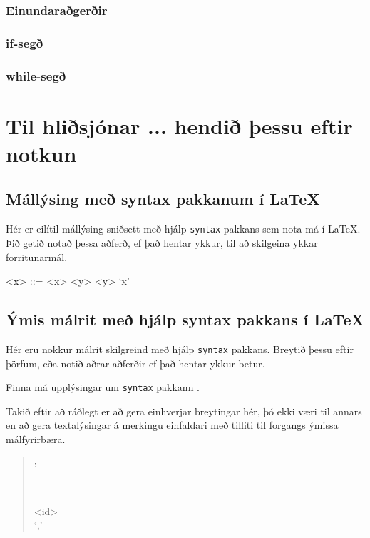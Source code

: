 \documentclass[12pt,a4paper]{article}
\newenvironment{málrit}[1]{%
	\par\noindent\begin{minipage}{\linewidth}\vspace{0.5em}\begin{quote}\noindent%
	\hspace*{-2em}\synt{#1}:\hfill\par%
	\noindent%
	\begin{minipage}{\linewidth}\begin{syntdiag}%
}{%
	\end{syntdiag}\end{minipage}\end{quote}\end{minipage}%
}
\begin{document}
\subsubsection{Einundaraðgerðir}
\subsubsection{if-segð}
\subsubsection{while-segð}
\section{Til hliðsjónar ... hendið þessu eftir notkun}

\subsection{Mállýsing með syntax pakkanum í LaTeX}

Hér er eilítil mállýsing sniðsett með hjálp {\tt syntax} pakkans sem
nota má í \LaTeX. Þið getið notað þessa aðferð, ef það hentar ykkur,
til að skilgeina ykkar forritunarmál.

\begin{grammar}
<x> ::= <x> <y>
	 `x'
\end{grammar}

\subsection{Ýmis málrit með hjálp syntax pakkans í LaTeX}

Hér eru nokkur málrit skilgreind með hjálp {\tt syntax} pakkans.
Breytið þessu eftir þörfum, eða notið aðrar
aðferðir ef það hentar ykkur betur.

Finna má upplýsingar um {\tt syntax} pakkann
.

Takið eftir að ráðlegt er að gera einhverjar breytingar hér,
þó ekki væri til annars en að gera textalýsingar á merkingu
einfaldari með tilliti til forgangs ýmissa málfyrirbæra.

\begin{málrit}{id_list}
	\begin{stack}
	
	\\
		\begin{rep}  \\ `,' \end{rep}
	\end{stack}
\end{málrit}%
\end{document}

